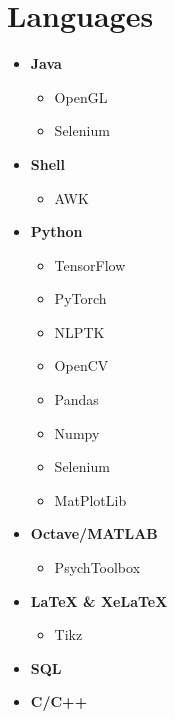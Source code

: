 \documentclass[]{chandan-cv}
\begin{document}
\begin{minipage}[t]{0.26\textwidth}


\section{Languages}
	\begin{itemize}
		\setlength\itemsep{-0.2em}
		\item \textbf{Java}
			\begin{itemize}
				\setlength\itemsep{-0.2em}
				\item OpenGL
				\item Selenium
			\end{itemize}
		\item \textbf{Shell}
			\begin{itemize}
				\setlength\itemsep{-0.2em}
				\item AWK
			\end{itemize}
		\item \textbf{Python}
			\begin{itemize}
				\setlength\itemsep{-0.2em}
				\item TensorFlow
				\item PyTorch
				\item NLPTK
				\item OpenCV
				\item Pandas
				\item Numpy
				\item Selenium
				\item MatPlotLib
			\end{itemize}
		\item \textbf{Octave/MATLAB}
			\begin{itemize}
				\setlength\itemsep{-0.2em}
				\item PsychToolbox
			\end{itemize}
		\item \textbf{LaTeX \& XeLaTeX}
			\begin{itemize}
				\setlength\itemsep{-0.2em}
				\item Tikz
			\end{itemize}
		\item \textbf{SQL}
		\item \textbf{C/C++}
	\end{itemize}
\sectionsep



\end{minipage}
\end{document}
